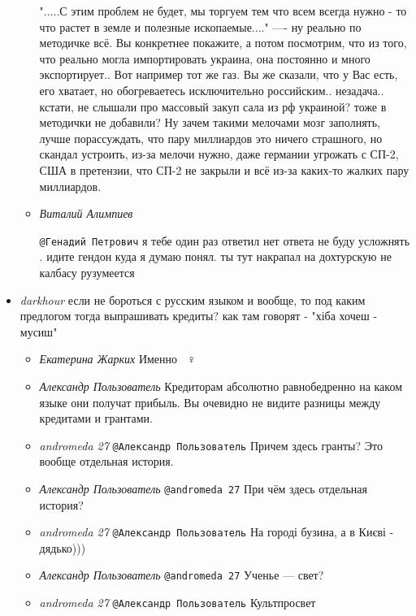 \begin{itemize}
\begin{itemize}
".....С этим проблем не будет, мы торгуем тем что всем всегда нужно - то что
растет в земле и полезные ископаемые...." ---- ну реально по методичке всё. Вы
конкретнее покажите, а потом посмотрим, что из того, что реально могла
импортировать украина, она постоянно и много экспортирует.. Вот например тот же
газ. Вы же сказали, что у Вас есть, его хватает, но обогреваетесь исключительно
российским.. незадача.. кстати, не слышали про массовый закуп сала из рф
украиной? тоже в методички не добавили? Ну зачем такими мелочами мозг
заполнять, лучше порассуждать, что пару миллиардов это ничего страшного, но
скандал устроить, из-за мелочи нужно, даже германии угрожать с СП-2, США в
претензии, что СП-2 не закрыли и всё из-за каких-то жалких пару миллиардов.

\item \emph{Виталий Алимпиев}

\verb|@Генадий Петрович| я тебе один раз ответил нет ответа не буду
усложнять . идите гендон куда я думаю понял. ты тут накрапал на дохтурскую не
калбасу рузумеется

\end{itemize}


\item \emph{darkhour}
если не бороться с русским языком и вообще, то под каким предлогом тогда
выпрашивать кредиты? как там говорят - "хіба хочеш - мусиш"

\begin{itemize}
\item \emph{Екатерина Жарких}
Именно 🤷🏼♀️

\item \emph{Александр Пользователь}
Кредиторам абсолютно равнобедренно на каком языке они получат прибыль. Вы
очевидно не видите разницы между кредитами и грантами.

\item \emph{andromeda 27}
\verb|@Александр Пользователь|  Причем здесь гранты? Это вообще отдельная история.

\item \emph{Александр Пользователь}
\verb|@andromeda 27|  При чём здесь отдельная история?

\item \emph{andromeda 27}
\verb|@Александр Пользователь|  На городі бузина, а в Києві - дядько)))

\item \emph{Александр Пользователь}
\verb|@andromeda 27|  Ученье — свет?

\item \emph{andromeda 27}
\verb|@Александр Пользователь|  Культпросвет


\end{itemize}
\end{itemize}
